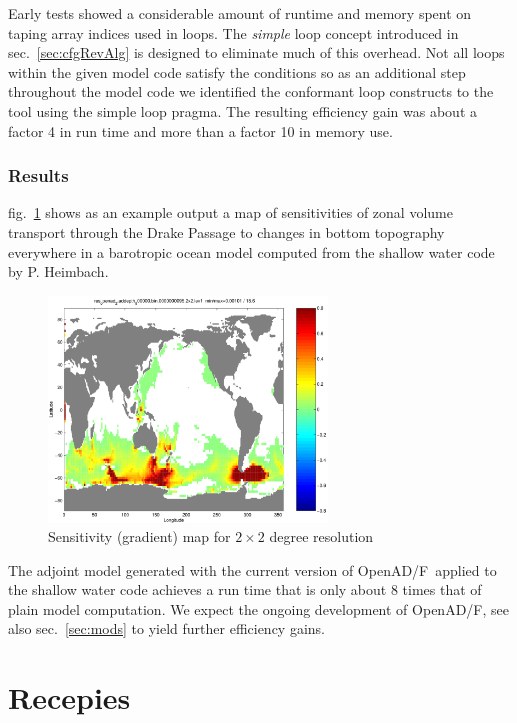 \documentclass{book}
\newcommand{\OpenADF}{OpenAD/F}
\newcommand{\refsec}[1]{{sec.~\ref{#1}}}
\newcommand{\reffig}[1]{{fig.~\ref{#1}}}
\begin{document}
Early tests showed a considerable amount of runtime and memory 
spent on taping array indices used in loops. 
The {\em simple} loop concept introduced in \refsec{sec:cfgRevAlg}
is designed to eliminate much of this overhead. 
Not all loops within the given model code satisfy the conditions 
so as an additional step throughout the model code 
we identified the conformant loop constructs to 
the tool using the simple loop pragma. The resulting efficiency gain
was about a factor 4 in run time and more than a factor 10 in memory 
use.

\subsection{Results}
\reffig{fig:sensMap} shows as an example output a map of sensitivities of 
zonal volume transport through the Drake Passage 
to changes in bottom topography everywhere in a barotropic ocean model 
computed from the shallow water code by P. Heimbach.
\begin{figure}
\begin{center}
\includegraphics[height=6cm]{sensMap}
\end{center}
\caption{Sensitivity (gradient) map for $2\times 2$ degree resolution}\label{fig:sensMap}
\end{figure} 
The adjoint model generated with the current version of \OpenADF\ applied to the 
shallow water code achieves 
a run time that is only about 8 times that of  plain model computation.
We expect the ongoing development of \OpenADF, see also \refsec{sec:mods} to yield 
further efficiency gains.

\chapter{Recepies}\label{sec:recepies}
\end{document}
